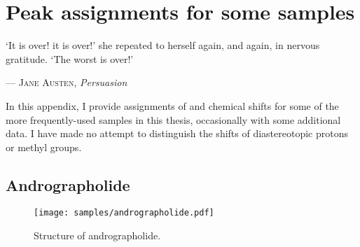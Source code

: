 \chapter{Peak assignments for some samples}
\label{chpt:assignments}

\epigraph{\singlespacing%
`It is over! it is over!' she repeated to herself again, and again, in nervous gratitude. `The worst is over!'
}{--- \textsc{Jane Austen}, \textit{Persuasion}}

In this appendix, I provide assignments of \proton{} and \carbon{} chemical shifts for some of the more frequently-used samples in this thesis, occasionally with some additional data.
I have made no attempt to distinguish the shifts of diastereotopic protons or methyl groups.

\clearpage 

\section{Andrographolide}

\begin{figure}[!ht]
    \centering
    \texttt{[image: samples/andrographolide.pdf]}%
    \caption[Structure of andrographolide]{
        Structure of andrographolide.
    }
    \label{fig:samples_andrographolide}
\end{figure}

